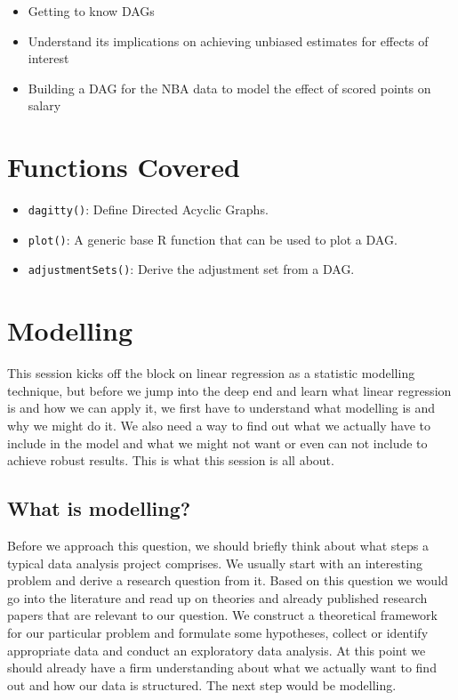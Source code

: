 \documentclass[
]{book}
\providecommand{\tightlist}{%
  \setlength{\itemsep}{0pt}\setlength{\parskip}{0pt}}
\begin{document}
\begin{itemize}
\tightlist
\item
  Getting to know DAGs
\item
  Understand its implications on achieving unbiased estimates for effects of interest
\item
  Building a DAG for the NBA data to model the effect of scored points on salary
\end{itemize}

\hypertarget{functions-covered}{%
\section{Functions Covered}\label{functions-covered}}

\begin{itemize}
\tightlist
\item
  \texttt{dagitty()}: Define Directed Acyclic Graphs.
\item
  \texttt{plot()}: A generic base R function that can be used to plot a DAG.
\item
  \texttt{adjustmentSets()}: Derive the adjustment set from a DAG.
\end{itemize}

\hypertarget{modelling}{%
\section{Modelling}\label{modelling}}

This session kicks off the block on linear regression as a statistic
modelling technique, but before we jump into the deep end and learn what
linear regression is and how we can apply it, we first have to understand
what modelling is and why we might do it. We also need a way to find out what we actually have to include in the model and what we might not want or even can not include to achieve robust results. This is what this session is all about.

\hypertarget{what-is-modelling}{%
\subsection{What is modelling?}\label{what-is-modelling}}

Before we approach this question, we should briefly think about what steps a
typical data analysis project comprises. We usually start with an interesting
problem and derive a research question from it. Based on this question we would go into the literature and read up on theories and already published research papers that are relevant to our question. We construct a theoretical framework for our particular problem and formulate some hypotheses, collect or identify appropriate data and conduct an exploratory data analysis. At this point we should already have a firm understanding about what we actually want to find out and how our data is structured. The next step would be modelling.
\end{document}

